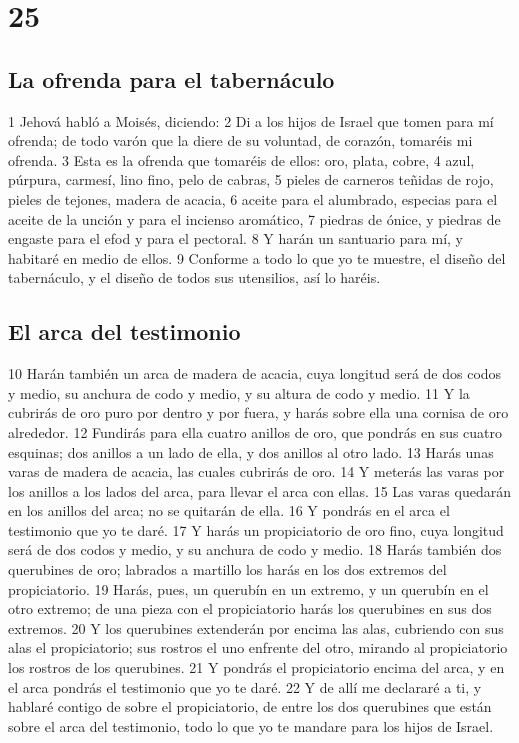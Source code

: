 \chapter{25}

\section{La ofrenda para el tabernáculo}

1 Jehová habló a Moisés, diciendo:
2 Di a los hijos de Israel que tomen para mí ofrenda; de todo varón que la diere de su voluntad, de corazón, tomaréis mi ofrenda.
3 Esta es la ofrenda que tomaréis de ellos: oro, plata, cobre,
4 azul, púrpura, carmesí, lino fino, pelo de cabras,
5 pieles de carneros teñidas de rojo, pieles de tejones, madera de acacia,
6 aceite para el alumbrado, especias para el aceite de la unción y para el incienso aromático,
7 piedras de ónice, y piedras de engaste para el efod y para el pectoral.
8 Y harán un santuario para mí, y habitaré en medio de ellos.
9 Conforme a todo lo que yo te muestre, el diseño del tabernáculo, y el diseño de todos sus utensilios, así lo haréis.

\section{El arca del testimonio}

10 Harán también un arca de madera de acacia, cuya longitud será de dos codos   y medio, su anchura de codo y medio, y su altura de codo y medio.
11 Y la cubrirás de oro puro por dentro y por fuera, y harás sobre ella una cornisa de oro alrededor.
12 Fundirás para ella cuatro anillos de oro, que pondrás en sus cuatro esquinas; dos anillos a un lado de ella, y dos anillos al otro lado.
13 Harás unas varas de madera de acacia, las cuales cubrirás de oro.
14 Y meterás las varas por los anillos a los lados del arca, para llevar el arca con ellas.
15 Las varas quedarán en los anillos del arca; no se quitarán de ella.
16 Y pondrás en el arca el testimonio que yo te daré.
17 Y harás un propiciatorio de oro fino, cuya longitud será de dos codos   y medio, y su anchura de codo y medio.
18 Harás también dos querubines de oro; labrados a martillo los harás en los dos extremos del propiciatorio.
19 Harás, pues, un querubín en un extremo, y un querubín en el otro extremo; de una pieza con el propiciatorio harás los querubines en sus dos extremos.
20 Y los querubines extenderán por encima las alas, cubriendo con sus alas el propiciatorio; sus rostros el uno enfrente del otro, mirando al propiciatorio los rostros de los querubines.
21 Y pondrás el propiciatorio encima del arca, y en el arca pondrás el testimonio que yo te daré.
22 Y de allí me declararé a ti, y hablaré contigo de sobre el propiciatorio, de entre los dos querubines que están sobre el arca del testimonio, todo lo que yo te mandare para los hijos de Israel.

